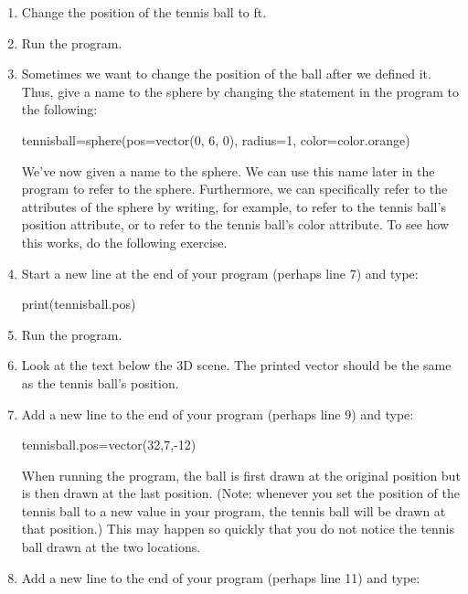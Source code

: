 \begin{enumerate}
	
	\item Change the position of the tennis ball to  ft. 

	\item Run the program.

	\item Sometimes we want to change the position of the ball after we defined it. Thus, give a name to the sphere by changing the  statement in the program to the following:

\begin{myvpython}
tennisball=sphere(pos=vector(0, 6, 0), radius=1, color=color.orange)
\end{myvpython}

We've now given a name to the sphere. We can use this name later in the program to refer to the sphere. Furthermore, we can specifically refer to the attributes of the sphere by writing, for example,  to refer to the tennis ball's position attribute, or  to refer to the tennis ball's color attribute. To see how this works, do the following exercise.

	\item Start a new line at the end of your program (perhaps line 7) and type:

\begin{myvpython}
print(tennisball.pos)
\end{myvpython}


	\item Run the program.

	\item Look at the text below the 3D scene. The printed vector should be the same as the tennis ball's position.

	\item Add a new line to the end of your program (perhaps line 9) and type:
	
\begin{myvpython}
tennisball.pos=vector(32,7,-12)
\end{myvpython}
	
	When running the program, the ball is first drawn at the original position but is then drawn at the last position. (Note: whenever you set the position of the tennis ball to a new value in your program, the tennis ball will be drawn at that position.) This may happen so quickly that you do not notice the tennis ball drawn at the two locations.
	
	\item Add a new line to the end of your program (perhaps line 11) and type:
	

\end{enumerate}
